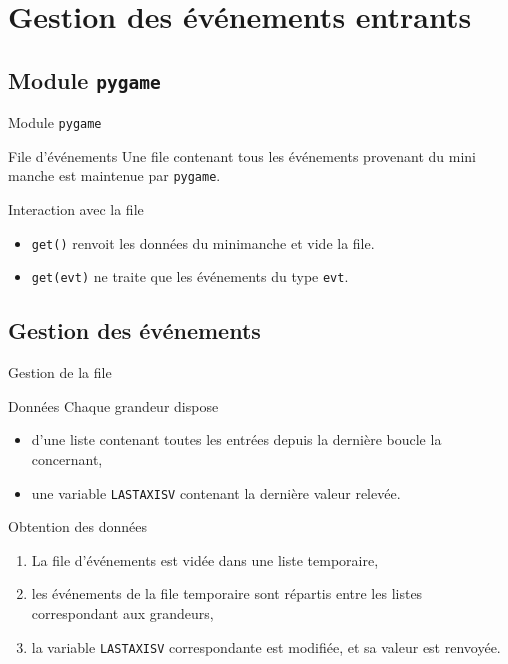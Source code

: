 \documentclass[footheight=2em]{beamer}
\begin{document}
\section{Gestion des événements entrants}
\subsection{Module \texttt{pygame}}
\begin{frame}[t]{Module \texttt{pygame}}
  \begin{block}{File d'événements}
    Une file contenant tous les événements provenant du mini manche est
    maintenue par \texttt{pygame}.
  \end{block}
  \begin{block}{Interaction avec la file}
    \begin{itemize}
      \item \texttt{get()} renvoit les données du minimanche et vide la file.
      \item \texttt{get(evt)} ne traite que les événements du type \texttt{evt}.
    \end{itemize}
  \end{block}
\end{frame}

\subsection{Gestion des événements}
\begin{frame}[t]{Gestion de la file}
  \begin{block}{Données}
    Chaque grandeur dispose
    \begin{itemize}
      \item d'une liste contenant toutes les entrées depuis la dernière boucle
        la concernant,
      \item une variable \texttt{LASTAXISV} contenant la dernière
        valeur relevée.
    \end{itemize}
  \end{block}
  \begin{block}{Obtention des données}
    \begin{enumerate}
      \item La file d'événements est vidée dans une liste temporaire,
      \item les événements de la file temporaire sont répartis entre les listes
        correspondant aux grandeurs,
      \item la variable \texttt{LASTAXISV} correspondante est modifiée, et sa
        valeur est renvoyée.
    \end{enumerate}
  \end{block}
\end{frame}
\end{document}
